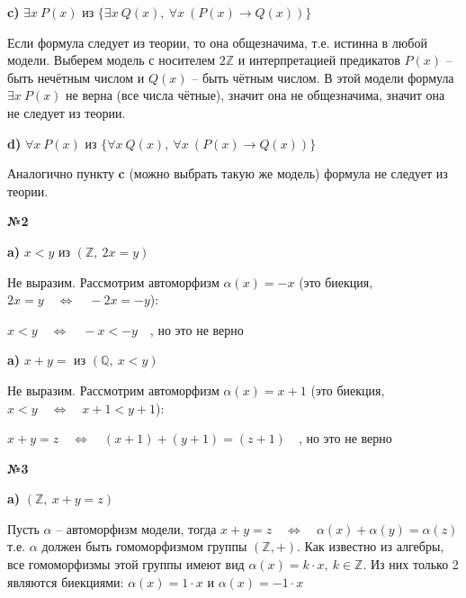 \documentclass{article}
\newenvironment{task}{\begin{center}\fontsize{14}{14}\selectfont\bf}{\rm\fontsize{12}{12}\selectfont\end{center}}
\newcommand{\impl}{\quad \Leftrightarrow \quad}
\begin{document}
	\begin{center}
		\textbf{c)} $\exists x \ P(x)$ из $\lbrace \exists x\ Q(x), \ \forall x\ (P(x) \rightarrow Q(x))\rbrace$
	\end{center}
	Если формула следует из теории, то она общезначима, т.е. истинна в любой модели. Выберем модель с носителем $2\mathbb{Z}$ и интерпретацией предикатов $P(x)$ -- быть нечётным числом и $Q(x)$ -- быть чётным числом. В этой модели формула $\exists x\ P(x)$ не верна (все числа чётные), значит она не общезначима, значит она не следует из теории.
	\begin{center}
		\textbf{d)} $\forall x \ P(x)$ из $\lbrace \forall x\ Q(x), \ \forall x\ (P(x) \rightarrow Q(x))\rbrace$
	\end{center}
	Аналогично пункту \textbf{c} (можно выбрать такую же модель) формула не следует из теории.
	
	
	\begin{task} 
		№2
	\end{task}
	\begin{center}
		\textbf{a)} $x < y$ из $(\mathbb{Z}, \ 2x=y)$  
	\end{center}
	Не выразим. Рассмотрим автоморфизм $\alpha(x) = -x$ (это биекция, $2x = y \impl -2x = -y$):
	\begin{center}
		$x < y \impl -x < -y\quad $, но это не верно\\ 
	\end{center}

	\begin{center}
		\textbf{a)} $x + y = $ из $(\mathbb{Q}, \ x < y)$  
	\end{center}
	Не выразим. Рассмотрим автоморфизм $\alpha(x) = x + 1$ (это биекция, $x < y \impl x + 1 < y + 1$):
	\begin{center}
		$x + y = z \impl (x + 1) + (y+1) = (z+1)\quad $, но это не верно\\ 
	\end{center}

	
	
	\begin{task} 
		№3
	\end{task}
	\begin{center}
		\textbf{a)} $(\mathbb{Z}, \ x+y=z)$  
	\end{center}
	Пусть $\alpha$ -- автоморфизм модели, тогда $x+y=z \impl \alpha(x) + \alpha(y) = \alpha(z)$ т.е. $\alpha$ должен быть гомоморфизмом группы $(\mathbb{Z}, +)$. Как известно из алгебры, все гомоморфизмы этой группы имеют вид $\alpha(x) = k\cdot x, \ k \in \mathbb{Z}$. Из них только 2 являются биекциями: $\alpha(x) = 1\cdot x$ и $\alpha(x) = -1 \cdot x$ 
	
\end{document}

